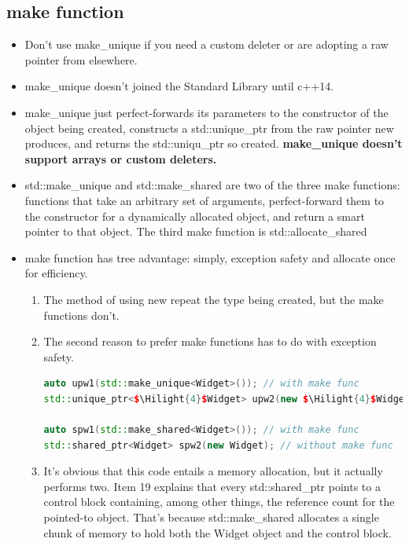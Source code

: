 \documentclass[a4paper,12pt,twoside]{book}
\newcommand{\Hilight}[1]{\makebox[0pt][l]{\color{yellow}\rule[-3pt]{#1em}{11pt}}}
\begin{document}
\subsection{make function}
\begin{itemize}

\item Don't use make\_unique if you need a custom deleter or are adopting a raw pointer from elsewhere.

\item make\_unique doesn't joined the Standard Library until c++14.

\item make\_unique just perfect-forwards its parameters to the constructor of the object being created, constructs a std::unique\_ptr from the raw pointer new produces, and returns the std::uniqu\_ptr so created. \textbf{make\_unique doesn't support arrays or custom deleters.}

\item std::make\_unique and std::make\_shared are two of the three make functions: functions that take an arbitrary set of arguments, perfect-forward them to the constructor for a dynamically allocated object, and return a smart pointer to that object. The third make function is std::allocate\_shared
		
\item make function has tree advantage: simply, exception safety and allocate once for efficiency.

\begin{enumerate}
\item The method of using new repeat the type being created, but the make functions don't.  

\item The second reason to prefer make functions has to do with exception safety.
\begin{lstlisting}[frame=single, language=c++, mathescape=true]
auto upw1(std::make_unique<Widget>()); // with make func
std::unique_ptr<$\Hilight{4}$Widget> upw2(new $\Hilight{4}$Widget); // without make func

auto spw1(std::make_shared<Widget>()); // with make func
std::shared_ptr<Widget> spw2(new Widget); // without make func
\end{lstlisting}

\item It's obvious that this code entails a memory allocation, but it actually performs two. Item 19 explains that every std::shared\_ptr points to a control block containing, among other things, the reference count for the pointed-to object. That's because std::make\_shared allocates a single chunk of memory to hold both the Widget object and the control block.


\end{enumerate}
\end{itemize}
\end{document}

